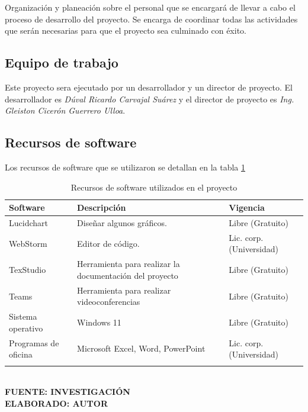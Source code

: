 Organización y planeación sobre el personal que se encargará de llevar a cabo el proceso de desarrollo del proyecto. Se encarga de coordinar todas las actividades que serán necesarias para que el proyecto sea culminado con éxito.

\subsection{Equipo de trabajo}


Este proyecto sera ejecutado por un desarrollador y un director de proyecto. El desarrollador es \textit{Dúval Ricardo Carvajal Suárez} y el director de proyecto es \textit{Ing. Gleiston Cicerón Guerrero Ulloa}.

\subsection{Recursos de software}

Los recursos de software que se utilizaron  se detallan en la tabla \ref{tab:recursosSoftware}

\begin{table}[h!]
	\centering
	\caption{Recursos de software utilizados en el proyecto}
		\label{tab:recursosSoftware}
	\begin{tabular}{p{3cm}p{6cm}p{5cm}}
		\toprule
		\textbf{Software} & \textbf{Descripción} & \textbf{Vigencia} \\
		\midrule
		Lucidchart & Diseñar algunos gráficos. & Libre (Gratuito) \\
		\addlinespace
		WebStorm & Editor de código. & Lic. corp. (Universidad) \\
		\addlinespace
		TexStudio & Herramienta para realizar la documentación del proyecto & Libre (Gratuito) \\
		\addlinespace
		Teams & Herramienta para realizar videoconferencias & Libre (Gratuito) \\
		\addlinespace
		Sistema operativo & Windows 11 & Libre (Gratuito) \\
		\addlinespace
		Programas de oficina & Microsoft Excel, Word, PowerPoint & Lic. corp. (Universidad) \\
		\addlinespace
		\bottomrule
	\end{tabular}
	\vspace{4mm}
	{\footnotesize \textbf{\\ FUENTE: INVESTIGACIÓN} \textbf{\\ ELABORADO: AUTOR}}
\end{table}

